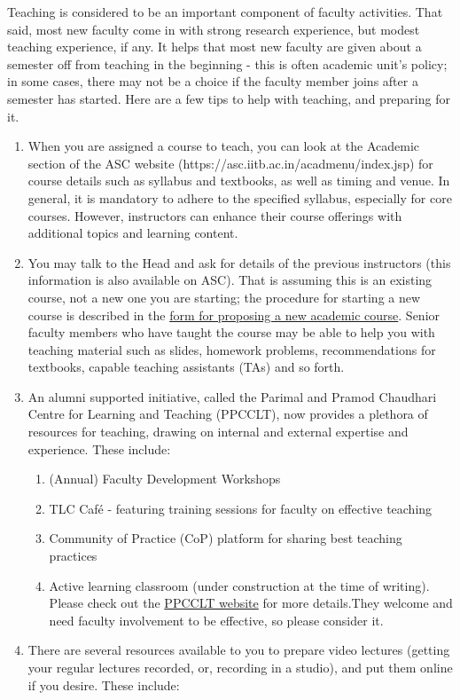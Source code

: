 \documentclass[
  10pt,
  a5paper,
  10pt,
  openany]{amsbook}
\providecommand{\tightlist}{%
  \setlength{\itemsep}{0pt}\setlength{\parskip}{0pt}}
\begin{document}
Teaching is considered to be an important component of faculty
activities. That said, most new faculty come in with strong research
experience, but modest teaching experience, if any. It helps that most
new faculty are given about a semester off from teaching in the
beginning - this is often academic unit's policy; in some cases, there
may not be a choice if the faculty member joins after a semester has
started. Here are a few tips to help with teaching, and preparing for
it.

\begin{enumerate}
\def\labelenumi{\arabic{enumi}.}
\item
  When you are assigned a course to teach, you can look at the Academic
  section of the ASC website (https://asc.iitb.ac.in/acadmenu/index.jsp)
  for course details such as syllabus and textbooks, as well as timing
  and venue. In general, it is mandatory to adhere to the specified
  syllabus, especially for core courses. However, instructors can
  enhance their course offerings with additional topics and learning
  content.
\item
  You may talk to the Head and ask for details of the previous
  instructors (this information is also available on ASC). That is
  assuming this is an existing course, not a new one you are starting;
  the procedure for starting a new course is described in the
  \href{http://www.iitb.ac.in/newacadhome/RevisedCourseProposalFormat20154March.pdf}{form
  for proposing a new academic course}. Senior faculty members who have
  taught the course may be able to help you with teaching material such
  as slides, homework problems, recommendations for textbooks, capable
  teaching assistants (TAs) and so forth.
\item
  An alumni supported initiative, called the Parimal and Pramod
  Chaudhari Centre for Learning and Teaching (PPCCLT), now provides a
  plethora of resources for teaching, drawing on internal and external
  expertise and experience. These include:

  \begin{enumerate}
  \def\labelenumii{\alph{enumii}.}
  \tightlist
  \item
    (Annual) Faculty Development Workshops
  \item
    TLC Café - featuring training sessions for faculty on effective
    teaching
  \item
    Community of Practice (CoP) platform for sharing best teaching
    practices
  \item
    Active learning classroom (under construction at the time of
    writing). Please check out the
    \href{http://www.ppcclt.iitb.ac.in}{PPCCLT website} for more
    details.They welcome and need faculty involvement to be effective,
    so please consider it.
  \end{enumerate}
\item
  There are several resources available to you to prepare video lectures
  (getting your regular lectures recorded, or, recording in a studio),
  and put them online if you desire. These include:


\end{enumerate}
\end{document}
